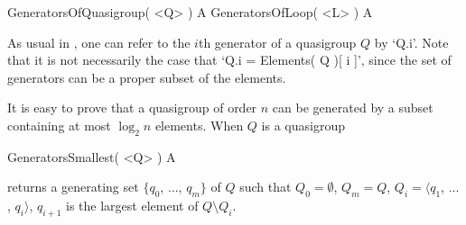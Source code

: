 \>GeneratorsOfQuasigroup( <Q> ) A
\>GeneratorsOfLoop( <L> ) A

As usual in {\GAP}, one can refer to the $i$th generator of a quasigroup $Q$ by
`Q.i'. Note that it is not necessarily the case that `Q.i = Elements( Q )[ i
]', since the set of generators can be a proper subset of the elements.

It is easy to prove that a quasigroup of order $n$ can be generated by a subset
containing at most $\log_2{n}$ elements. When $Q$ is a quasigroup

\>GeneratorsSmallest( <Q> ) A

returns a generating set $\{q_0$, $\dots$, $q_m\}$ of $Q$ such that
$Q_0=\emptyset$, $Q_m=Q$, $Q_i=\langle q_1$, $\dots$, $q_i \rangle$, $q_{i+1}$
is the largest element of $Q\setminus Q_i$.
